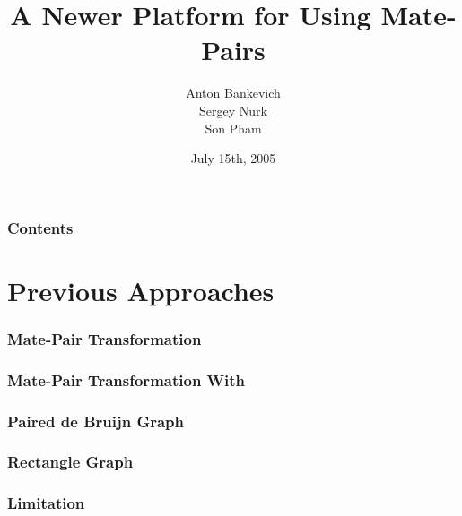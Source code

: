 \documentclass{beamer}
\title{A Newer Platform for Using Mate-Pairs }
\author{Anton Bankevich \\ Sergey Nurk \\ Son Pham }
\date{July 15th, 2005}
\begin{document}
\begin{frame}
\titlepage
\end{frame}

\begin{frame}
    \frametitle{Contents}
    \tableofcontents[pausesections]
\end{frame}
\section{Previous Approaches}
\begin{frame}
    \frametitle{Mate-Pair Transformation}
\end{frame}

\begin{frame}
    \frametitle{Mate-Pair Transformation With }
\end{frame}

\begin{frame}
    \frametitle{Paired de Bruijn Graph}
\end{frame}

\begin{frame}
    \frametitle{Rectangle Graph}
\end{frame}

\begin{frame}
    \frametitle{Limitation}
\end{frame}

\begin{frame}
    \frametitle{}
\end{frame}

\begin{frame}
    \frametitle{}
\end{frame}


\begin{frame}
    \frametitle{}
\end{frame}



\begin{frame}
    \frametitle{}
\end{frame}
\end{document}
